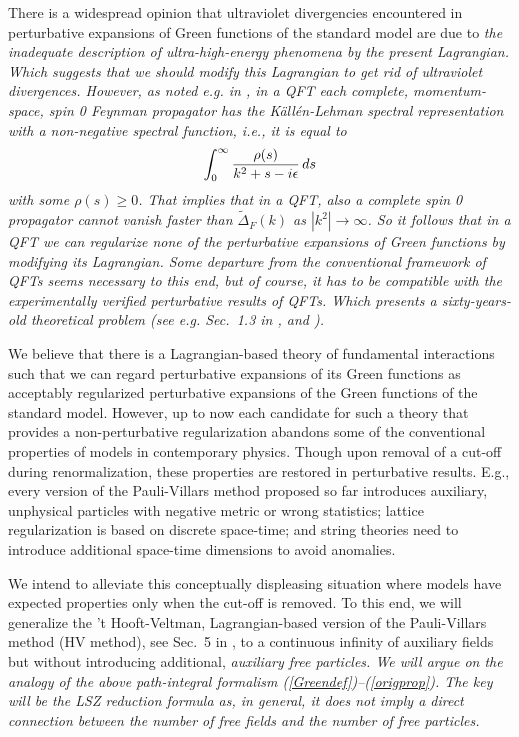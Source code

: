 \documentclass[a4paper,12pt]{article}
\newcommand{\prop}{\widetilde{\Delta}}
\newcommand{\propF}{\prop_F}
\begin{document}
There is a widespread opinion that ultraviolet divergencies encountered in perturbative expansions of Green functions of the standard model are due to \it the inadequate description of ultra-high-energy phenomena by the present Lagrangian. \rm Which suggests that we should modify this Lagrangian to get rid of ultraviolet divergences. However, as noted e.g. in \cite{Weinberg}, in a QFT each complete, momentum-space, spin 0 Feynman propagator has the K\"all\'en-Lehman spectral representation with a non-negative spectral function, i.e., it is equal to
\begin{equation}
   \int_0^\infty {\rho(s)\over k^2 + s - i\epsilon}\, ds
   \label{Kahlenrep}
\end{equation}
with some $\rho(s) \ge 0$. That implies that in a QFT, also a complete spin 0 propagator cannot vanish faster than $\propF(k)$ as $| k^2 | \to \infty $. So it follows that in a QFT we can regularize none of the perturbative expansions of Green functions by modifying its Lagrangian. \it Some departure from the conventional framework of QFTs seems necessary to this end, but of course, it has to be compatible with the experimentally verified perturbative results of QFTs. \rm Which presents a sixty-years-old theoretical problem (see e.g. Sec.~1.3 in \cite{Weinberg}, and \cite{Villars}).

We believe that there is a Lagrangian-based theory of fundamental interactions such that we can regard perturbative expansions of its Green functions as acceptably regularized perturbative expansions of the Green functions of the standard model. However, up to now each candidate for such a theory that provides a non-perturbative regularization abandons some of the conventional properties of models in contemporary physics. Though upon removal of a cut-off during renormalization, these properties are restored in perturbative results. E.g., every version of the Pauli-Villars method proposed so far introduces auxiliary, unphysical particles with negative metric or wrong statistics; lattice regularization is based on discrete space-time; and string theories need to introduce additional space-time dimensions to avoid anomalies.

We intend to alleviate this conceptually displeasing situation where models have expected properties only when the cut-off is removed. To this end, we will generalize the 't Hooft-Veltman, Lagrangian-based version of the Pauli-Villars method (HV method), see Sec.~5 in \cite{Hooft}, to a continuous infinity of auxiliary fields but without introducing additional, \it auxiliary free particles. \rm We will \it argue \rm on the analogy of the above path-integral formalism (\ref{Greendef})--(\ref{origprop}). The key will be the LSZ reduction formula as, in general, \it it does not imply a direct connection between the number of free fields and the number of free particles. \rm 
\end{document}
